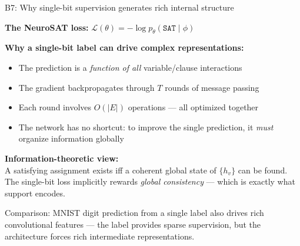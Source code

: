 \documentclass[aspectratio=169,10pt,dvipsnames]{beamer}
\begin{document}
\begin{frame}{B7: Why single-bit supervision generates rich internal structure}

\textbf{The NeuroSAT loss:} $\mathcal{L}(\theta) = -\log p_\theta(\texttt{SAT} \mid \phi)$

\medskip
\textbf{Why a single-bit label can drive complex representations:}
\begin{itemize}
  \item The prediction is a \textit{function of all} variable/clause interactions
  \item The gradient backpropagates through $T$ rounds of message passing
  \item Each round involves $O(|E|)$ operations — all optimized together
  \item The network has no shortcut: to improve the single prediction, it \textit{must} organize information globally
\end{itemize}

\medskip
\textbf{Information-theoretic view:}\\
A satisfying assignment exists iff a coherent global state of $\{h_v\}$ can be found. The single-bit
loss implicitly rewards \textit{global consistency} — which is exactly what support encodes.

\medskip\small
Comparison: MNIST digit prediction from a single label also drives rich convolutional features — the
label provides sparse supervision, but the architecture forces rich intermediate representations.
\end{frame}

\end{document}

